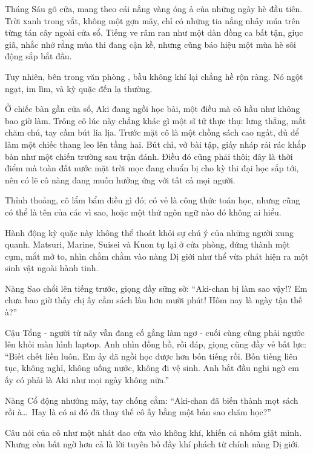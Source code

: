 \documentclass[../main.tex]{subfiles}
\begin{document}
Tháng Sáu gõ cửa, mang theo cái nắng vàng óng ả của những ngày hè đầu tiên. Trời xanh trong vắt, không một gợn mây, chỉ có những tia nắng nhảy múa trên từng tán cây ngoài cửa sổ. Tiếng ve râm ran như một dàn đồng ca bất tận, giục giã, nhắc nhở rằng mùa thi đang cận kề, nhưng cũng báo hiệu một mùa hè sôi động sắp bắt đầu.

Tuy nhiên, bên trong văn phòng \hll, bầu không khí lại chẳng hề rộn ràng. Nó ngột ngạt, im lìm, và kỳ quặc đến lạ thường.

Ở chiếc bàn gần cửa sổ, Aki đang ngồi học bài, một điều mà cô hầu như không bao giờ làm. Trông cô lúc này chẳng khác gì một sĩ tử thực thụ: lưng thẳng, mắt chăm chú, tay cầm bút lia lịa. Trước mặt cô là một chồng sách cao ngất, đủ để làm một chiếc thang leo lên tầng hai. Bút chì, vở bài tập, giấy nháp rải rác khắp bàn như một chiến trường sau trận đánh. Điều đó cũng phải thôi; đây là thời điểm mà toàn đất nước mặt trời mọc đang chuẩn bị cho kỳ thi đại học sắp tới, nên có lẽ cô nàng đang muốn hưởng ứng với tất cả mọi người.

Thỉnh thoảng, cô lẩm bẩm điều gì đó; có vẻ là công thức toán học, nhưng cũng có thể là tên của các vì sao, hoặc một thứ ngôn ngữ nào đó không ai hiểu.


Hành động kỳ quặc này không thể thoát khỏi sự chú ý của những người xung quanh. Matsuri, Marine, Suisei và Kuon tụ lại ở cửa phòng, đứng thành một cụm, mắt mở to, nhìn chằm chằm vào nàng Dị giới như thể vừa phát hiện ra một sinh vật ngoài hành tinh.


Nàng Sao chổi lên tiếng trước, giọng đầy sững sờ: ``Aki-chan bị làm sao vậy!? Em chưa bao giờ thấy chị ấy cầm sách lâu hơn mười phút! Hôm nay là ngày tận thế à?''

Cậu Tổng - người từ nãy vẫn đang cố gắng làm ngơ - cuối cùng cũng phải ngước lên khỏi màn hình laptop. Anh nhìn đồng hồ, rồi đáp, giọng cũng đầy vẻ bất lực: ``Biết chết liền luôn. Em ấy đã ngồi học được hơn bốn tiếng rồi. Bốn tiếng liên tục, không nghỉ, không uống nước, không đi vệ sinh. Anh bắt đầu nghi ngờ em ấy có phải là Aki như mọi ngày không nữa.''

Nàng Cổ động nhướng mày, tay chống cằm: ``Aki-chan đã biến thành mọt sách rồi à\dots\ Hay là có ai đó đã thay thế cô ấy bằng một bản sao chăm học?''

Câu nói của cô như một nhát dao cứa vào không khí, khiến cả nhóm giật mình. Nhưng còn bất ngờ hơn cả là lời tuyên bố đầy khí phách từ chính nàng Dị giới.
\end{document}
